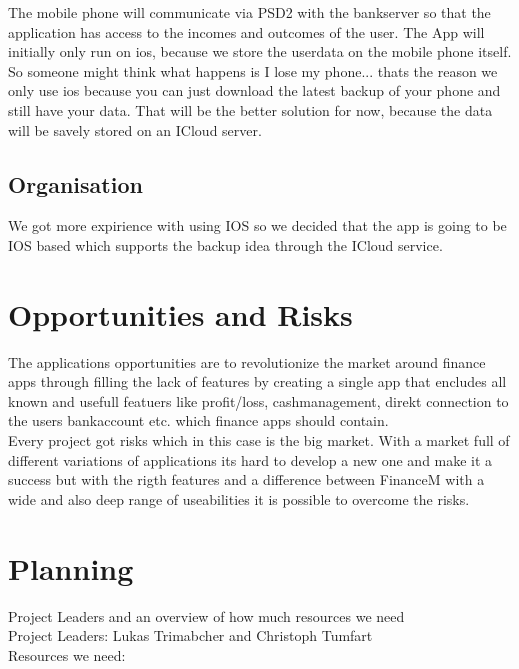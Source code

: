 \documentclass[12pt]{article}
\theoremstyle{definition}
\begin{document}
The mobile phone will communicate via PSD2 with the bankserver so that the application has access to the incomes and outcomes of the user.
The App will initially only run on ios, because we store the userdata on the mobile phone itself. So someone might think what happens is I lose my phone...
thats the reason we only use ios because you can just download the latest backup of your phone and still have your data.
That will be the better solution for now, because the data will be savely stored on an ICloud server.

\subsection{Organisation}

We got more expirience with using IOS so we decided that the app is going to be IOS based which supports the backup idea through the ICloud service.



\pagebreak
\section{Opportunities and Risks}

The applications opportunities are to revolutionize the market around finance apps
through filling the lack of features by creating a single app that encludes all known and usefull featuers like profit/loss, cashmanagement, direkt connection to the users bankaccount etc. which finance apps should contain. 
\\

Every project got risks which in this case is the big market.
With a market full of different variations of applications its hard to develop a new one and make it a success 
but with the rigth features and a difference between FinanceM with a wide and also deep range of useabilities it is possible to overcome the risks.

\pagebreak
\section{Planning}

Project Leaders and an overview of how much resources we need
\\

Project Leaders: Lukas Trimabcher and Christoph Tumfart
\\

Resources we need:
\\
\end{document}
